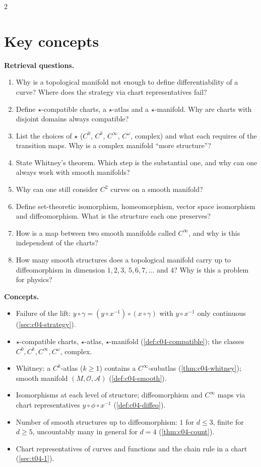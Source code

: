 \begin{paracol}{2}
\section*{Key concepts}
\begin{keyconcepts}
\textbf{Retrieval questions.}
\begin{enumerate}
  \item Why is a topological manifold not enough to define differentiability of a curve? Where does the strategy via chart representatives fail?
  \item Define $\star$-compatible charts, a $\star$-atlas and a $\star$-manifold. Why are charts with disjoint domains always compatible?
  \item List the choices of $\star$ ($C^0$, $C^k$, $C^\infty$, $C^\omega$, complex) and what each requires of the transition maps. Why is a complex manifold ``more structure''?
  \item State Whitney's theorem. Which step is the substantial one, and why can one always work with smooth manifolds?
  \item Why can one still consider $C^2$ curves on a smooth manifold?
  \item Define set-theoretic isomorphism, homeomorphism, vector space isomorphism and diffeomorphism. What is the structure each one preserves?
  \item How is a map between two smooth manifolds called $C^\infty$, and why is this independent of the charts?
  \item How many smooth structures does a topological manifold carry up to diffeomorphism in dimension $1,2,3$, $5,6,7,\dots$ and $4$? Why is this a problem for physics?
\end{enumerate}
\textbf{Concepts.}
\begin{itemize}
  \item Failure of the lift: $y\circ\gamma=(y\circ x^{-1})\circ(x\circ\gamma)$ with $y\circ x^{-1}$ only continuous (\cref{sec:c04-strategy}).
  \item $\star$-compatible charts, $\star$-atlas, $\star$-manifold (\cref{def:c04-compatible}); the classes $C^0,C^k,C^\infty,C^\omega$, complex.
  \item Whitney: a $C^k$-atlas ($k\ge1$) contains a $C^\infty$-subatlas (\cref{thm:c04-whitney}); smooth manifold $(M,\mathcal O,\mathcal A)$ (\cref{def:c04-smooth}).
  \item Isomorphisms at each level of structure; diffeomorphism and $C^\infty$ maps via chart representatives $y\circ\phi\circ x^{-1}$ (\cref{def:c04-diffeo}).
  \item Number of smooth structures up to diffeomorphism: $1$ for $d\le3$, finite for $d\ge5$, uncountably many in general for $d=4$ (\cref{thm:c04-count}).
  \item Chart representatives of curves and functions and the chain rule in a chart (\cref{sec:t04-1}).
\end{itemize}
\end{keyconcepts}

\flushside
\end{paracol}
